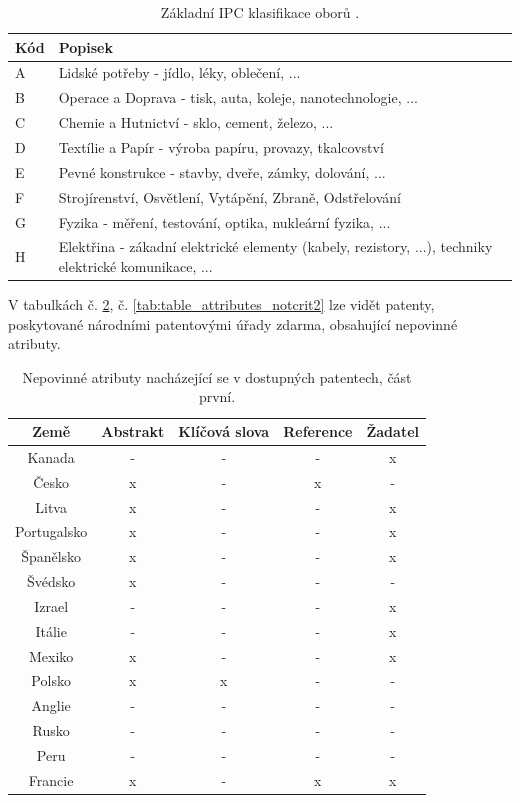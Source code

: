 	\begin{table}[H]
	\centering
	\begin{tabular}{|>{\centering\arraybackslash}p{1cm}|>{\centering\arraybackslash}p{12cm}|}
	\hline
	\textbf{Kód}    & \textbf{Popisek}\\
	\hline
	A & Lidské potřeby - jídlo, léky, oblečení, ... \\
	\hline
	B & Operace a Doprava - tisk, auta, koleje, nanotechnologie, ...\\
	\hline
	C & Chemie a Hutnictví - sklo, cement, železo, ...\\
	\hline
	D & Textílie a Papír - výroba papíru, provazy, tkalcovství \\
	\hline
	E & Pevné konstrukce -  stavby, dveře, zámky, dolování, ... \\
	\hline
	F & Strojírenství, Osvětlení, Vytápění, Zbraně, Odstřelování \\
	\hline
	G & Fyzika -  měření, testování, optika, nukleární fyzika, ...\\
	\hline
	H & Elektřina - zákadní elektrické elementy (kabely, rezistory, ...), techniky elektrické komunikace, ...  \\
	\hline
	\end{tabular}
	\caption{Základní \gls{IPC} klasifikace oborů \cite{ipc_class}.}
	\label{tab:kind_codes}
	\end{table}

\noindent V tabulkách č. \ref{tab:table_attributes_notcrit1}, č. \ref{tab:table_attributes_notcrit2} lze vidět patenty, poskytované národními patentovými úřady zdarma, obsahující nepovinné atributy.
	\begin{table}[H]
	\centering
	\begin{tabular}{|c|c|c|c|c|} 
	\hline
	\textbf{Země}    & \textbf{Abstrakt} & \textbf{Klíčová slova} & \textbf{Reference} & \textbf{Žadatel} \\
	\hline
	Kanada & - & - & - & x \\
	\hline
	Česko & x & - & x & - \\
	\hline
	Litva & x & - & - & x \\
	\hline
	Portugalsko & x & - & - & x \\
	\hline
	Španělsko & x & - & - & x \\
	\hline
	Švédsko & x & - & - & - \\
	\hline
	Izrael & - & - & - & x \\
	\hline
	Itálie & - & - & - & x \\
	\hline
	Mexiko & x & - & - & x \\
	\hline
	Polsko & x & x & - & - \\
	\hline
	Anglie & - & - & - & - \\
	\hline
	Rusko & - & - & - & - \\
	\hline
	Peru & - & - & - & - \\
	\hline
	Francie & x & - & x & x \\
	\hline
	\end{tabular}
	\caption{Nepovinné atributy nacházející se v dostupných patentech, část první.}
	\label{tab:table_attributes_notcrit1}
	\end{table}

